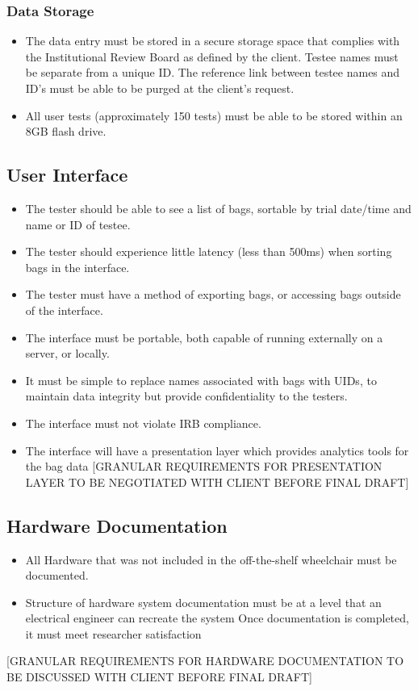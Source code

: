 \documentclass[onecolumn, draftclsnofoot,10pt, compsoc]{IEEEtran}
\begin{document}
\subsubsection{Data Storage}
\begin{itemize}
	\item The data entry must be stored in a secure storage space that complies with the Institutional Review Board as defined by the client.
	\subitem Testee names must be separate from a unique ID.
	\subitem The reference link between testee names and ID's must be able to be purged at the client's request.
	\item All user tests (approximately 150 tests) must be able to be stored within an 8GB flash drive.
\end{itemize}
\subsection{User Interface}
\begin{itemize}
	\item The tester should be able to see a list of bags, sortable by trial date/time and name or ID of testee.
	\item The tester should experience little latency (less than 500ms) when sorting bags in the interface.
	\item The tester must have a method of exporting bags, or accessing bags outside of the interface.
	\item The interface must be portable, both capable of running externally on a server, or locally.
	\item It must be simple to replace names associated with bags with UIDs, to maintain data integrity but provide confidentiality to the testers.
	\item The interface must not violate IRB compliance.
	\item The interface will have a presentation layer which provides analytics tools for the bag data [GRANULAR REQUIREMENTS FOR PRESENTATION LAYER TO BE NEGOTIATED WITH CLIENT BEFORE FINAL DRAFT]
\end{itemize}
\subsection{Hardware Documentation}
\begin{itemize}
	\item All Hardware that was not included in the off-the-shelf wheelchair must be documented.
	\item Structure of hardware system documentation must be at a level that an electrical engineer can recreate the system
		\subitem Once documentation is completed, it must meet researcher satisfaction
\end{itemize}
[GRANULAR REQUIREMENTS FOR HARDWARE DOCUMENTATION TO BE DISCUSSED WITH CLIENT BEFORE FINAL DRAFT]
\end{document}
